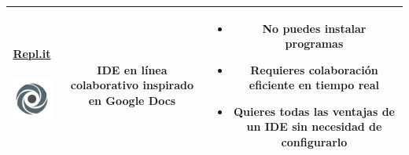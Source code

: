 \documentclass[11pt]{article}
\begin{document}
\begin{table}[!hbt]
\begin{center}
\begin{tabular}{c c c}
{                        \centering
                        \href{https://replit.com}{Repl.it}
                        \newline\newline
                        \includegraphics[height=1.5cm]{logo_replit}	
                    }	
                    &
                    \parbox[c]{3cm}{
                        IDE en línea colaborativo inspirado en Google Docs
                    }
                    &
                    \parbox[c]{8cm}{
                        \begin{itemize}
                            \item No puedes instalar programas
                            \item Requieres colaboración eficiente en tiempo real
                            \item Quieres todas las ventajas de un IDE sin necesidad de configurarlo
                        \end{itemize}
                    }
                    \\\hline
            \end{tabular}
        \end{center}
    \end{table}
\end{document}
